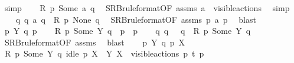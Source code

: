 \begin{isabellebody}
\ simp\isanewline
\ \ \isamarkupfalse%
\ {\isacartoucheopen}R\ p\ {\isacharparenleft}{\kern0pt}Some\ {\isacharbraceleft}{\kern0pt}a{\isacharbraceright}{\kern0pt}{\isacharparenright}{\kern0pt}\ q{\isacartoucheclose}\ \isamarkupfalse%
\ SRB{\isacharunderscore}{\kern0pt}ruleformat{\isacharparenleft}{\kern0pt}{}{\isacharparenright}{\kern0pt}{\isacharbrackleft}{\kern0pt}OF\ assms{\isacharbrackright}{\kern0pt}\ {\isacartoucheopen}a\ {\isasymin}\ visible{\isacharunderscore}{\kern0pt}actions{\isacartoucheclose}\ \isamarkupfalse%
\ simp\isanewline
\ \ \isamarkupfalse%
\ {\isacartoucheopen}{\isasymexists}q{\isacharprime}{\kern0pt}{\isachardot}{\kern0pt}\ q\ {\isasymlongmapsto}a\ q{\isacharprime}{\kern0pt}\ {\isasymand}\ R\ p{\isacharprime}{\kern0pt}\ None\ q{\isacharprime}{\kern0pt}{\isacartoucheclose}\ \isamarkupfalse%
\ SRB{\isacharunderscore}{\kern0pt}ruleformat{\isacharparenleft}{\kern0pt}{}{\isacharparenright}{\kern0pt}{\isacharbrackleft}{\kern0pt}OF\ assms{\isacharbrackright}{\kern0pt}\ {\isacartoucheopen}p\ {\isasymlongmapsto}a\ p{\isacharprime}{\kern0pt}{\isacartoucheclose}\ \isamarkupfalse%
\ blast\isanewline
{}\isamarkupfalse%
\isanewline
\ \ \isamarkupfalse%
\ p\ Y\ q\ p{\isacharprime}{\kern0pt}\isanewline
\ \ \isamarkupfalse%
\ {\isacartoucheopen}R\ p\ {\isacharparenleft}{\kern0pt}Some\ Y{\isacharparenright}{\kern0pt}\ q{\isacartoucheclose}\ \ {\isacartoucheopen}p\ {\isasymlongmapsto}{\isasymtau}\ p{\isacharprime}{\kern0pt}{\isacartoucheclose}\isanewline
\ \ \isamarkupfalse%
\ {\isacartoucheopen}{\isasymexists}q{\isacharprime}{\kern0pt}{\isachardot}{\kern0pt}\ q\ {\isasymlongmapsto}{\isasymtau}\ \ q{\isacharprime}{\kern0pt}\ {\isasymand}\ R\ p{\isacharprime}{\kern0pt}\ {\isacharparenleft}{\kern0pt}Some\ Y{\isacharparenright}{\kern0pt}\ q{\isacharprime}{\kern0pt}{\isacartoucheclose}\isanewline
\ \ \ \ \isamarkupfalse%
\ SRB{\isacharunderscore}{\kern0pt}ruleformat{\isacharparenleft}{\kern0pt}{}{\isacharparenright}{\kern0pt}{\isacharbrackleft}{\kern0pt}OF\ assms{\isacharbrackright}{\kern0pt}\ \isamarkupfalse%
\ blast\isanewline
{}\isamarkupfalse%
\isanewline
\ \ \isamarkupfalse%
\ p\ Y\ q\ p{\isacharprime}{\kern0pt}\ X\isanewline
\ \ \isamarkupfalse%
\ {\isacartoucheopen}R\ p\ {\isacharparenleft}{\kern0pt}Some\ Y{\isacharparenright}{\kern0pt}\ q{\isacartoucheclose}\ {\isacartoucheopen}idle\ p\ {\isacharparenleft}{\kern0pt}X\ {\isasymunion}\ Y{\isacharparenright}{\kern0pt}{\isacartoucheclose}\ {\isacartoucheopen}X\ {\isasymsubseteq}\ visible{\isacharunderscore}{\kern0pt}actions{\isacartoucheclose}\ {\isacartoucheopen}p\ {\isasymlongmapsto}t\ p{\isacharprime}{\kern0pt}{\isacartoucheclose}\isanewline

\end{isabellebody}
